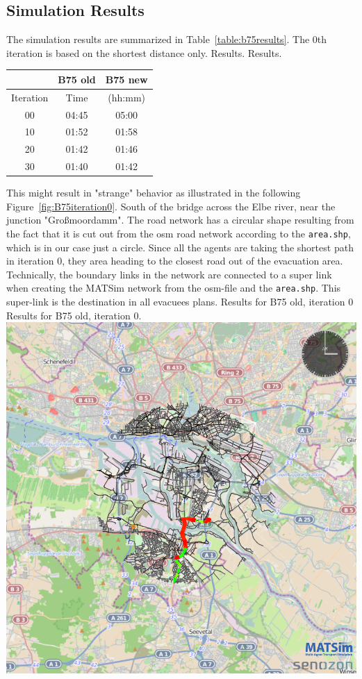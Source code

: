 \subsection{Simulation Results}
The simulation results are summarized in Table~\ref{table:b75results}. The 0th iteration is based on the shortest distance only. 
%
\createtable%
{Results.}%
{Results.}%
{\label{table:b75results}}%
{%
\begin{tabular}{|c|c|c|}
	\hline \rule[-2ex]{0pt}{5.5ex}  & B75 old & B75 new \\ 
	\hline \rule[-2ex]{0pt}{5.5ex}  Iteration & Time &  (hh:mm) \\ 
	\hline \rule[-2ex]{0pt}{5.5ex}  00 & 04:45 &  05:00\\ 
	\hline \rule[-2ex]{0pt}{5.5ex}  10 & 01:52 &  01:58\\ 
	\hline \rule[-2ex]{0pt}{5.5ex}  20 & 01:42 &  01:46\\ 
	\hline \rule[-2ex]{0pt}{5.5ex}  30 & 01:40 &  01:42\\ 
	\hline 
\end{tabular}
}%
{}%
%
This might result in "strange" behavior as illustrated in the following Figure~\ref{fig:B75iteration0}. South of the bridge across the Elbe river, near the junction "Gro{\ss}moordamm". The road network has a circular shape resulting from the fact that it is cut out from the osm road network according to the \lstinline|area.shp|, which is in our case just a circle. Since all the agents are taking the shortest path in iteration 0, they area heading to the closest road out of the evacuation area. Technically, the boundary links in the network are connected to a super link when creating the MATSim network from the osm-file and the \lstinline|area.shp|. This super-link is the destination in all evacuees plans. 
%
\createfigure%
{Results for B75 old, iteration 0}%
{Results for B75 old, iteration 0.}%
{\label{fig:B75iteration0}}%
{\includegraphics[width=0.7\linewidth]{using/figures/B75iteration0}}%
